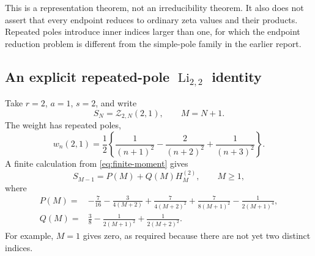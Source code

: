 \documentclass[11pt,letterpaper]{article}
\numberwithin{equation}{section}
\theoremstyle{definition}\newtheorem{definition}[theorem]{Definition}
\theoremstyle{remark}\newtheorem{remark}[theorem]{Remark}
\DeclareMathOperator{\Li}{Li}
\newcommand{\Z}{\mathcal Z}\newcommand{\Bell}{\mathcal B}
\begin{document}
This is a representation theorem, not an irreducibility theorem. It
also does not assert that every endpoint reduces to ordinary zeta values
and their products. Repeated poles introduce inner indices larger than
one, for which the endpoint reduction problem is different from the
simple-pole family in the earlier report.

\subsection{An explicit repeated-pole \texorpdfstring{$\Li_{2,2}$}{Li(2,2)} identity}
Take $r=2$, $a=1$, $s=2$, and write
\[
 S_N=\Z_{2,N}(2,1),\qquad M=N+1.
\]
The weight has repeated poles,
\[
 w_n(2,1)=\frac12\left\{\frac1{(n+1)^2}
                    -\frac2{(n+2)^2}+\frac1{(n+3)^2}\right\}.
\]
A finite calculation from \eqref{eq:finite-moment} gives
\begin{equation}\label{eq:cutoff-PQ}
 S_{M-1}=P(M)+Q(M)H_M^{(2)},\qquad M\ge1,
\end{equation}
where
\begin{align}
 P(M)={}&-\frac7{16}-\frac3{4(M+2)}+\frac7{4(M+2)^2}
                   +\frac7{8(M+1)^2}-\frac1{2(M+1)^4},\label{eq:Pexplicit}\\
 Q(M)={}&\frac38-\frac1{2(M+1)^2}+\frac1{2(M+2)^2}.
 \label{eq:Qexplicit}
\end{align}
For example, $M=1$ gives zero, as required because there are not yet
two distinct indices.
\end{document}
